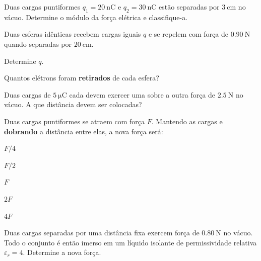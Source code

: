 \blocofixacao
\begin{questao}[1]{}

Duas cargas puntiformes $q_1=\SI{20}{\nano\coulomb}$ e
$q_2=\SI{30}{\nano\coulomb}$ estão separadas por $\SI{3}{\centi\meter}$ no
vácuo. Determine o módulo da força elétrica e classifique-a.


\end{questao}
\begin{questao}[1]{}

Duas esferas idênticas recebem cargas iguais $q$ e se repelem com força de
$\SI{0.90}{\newton}$ quando separadas por $\SI{20}{\centi\meter}$.
\begin{itensq}
\item Determine $q$.
\item Quantos elétrons foram \textbf{retirados} de cada esfera?
\end{itensq}


\end{questao}
\begin{questao}[1]{}

Duas cargas de $\SI{5}{\micro\coulomb}$ cada devem exercer uma sobre a outra
força de $\SI{2.5}{\newton}$ no vácuo. A que distância devem ser colocadas?


\end{questao}
\begin{questao}[1]{}

Duas cargas puntiformes se atraem com força $F$. Mantendo as cargas e
\textbf{dobrando} a distância entre elas, a nova força será:
\begin{alternativas}[3]
\item $F/4$
\item $F/2$
\item $F$
\item $2F$
\item $4F$
\end{alternativas}


\end{questao}
\begin{questao}[1]{}

Duas cargas separadas por uma distância fixa exercem força de
$\SI{0.80}{\newton}$ no vácuo. Todo o conjunto é então imerso em um líquido
isolante de permissividade relativa $\varepsilon_r=4$. Determine a nova força.


\end{questao}
